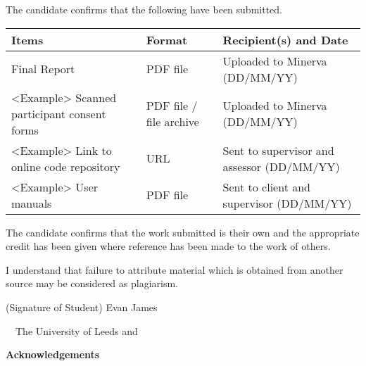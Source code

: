 \frontcover

\clearpage

\noindent The candidate confirms that the following have been submitted.\\


\begin{table}[ht!]
\begin{tabular}{|p{}|p{}|p{}|}
\hline 
Items & Format & Recipient(s) and Date \\ 
\hline 
Final Report & PDF file & Uploaded to Minerva (DD/MM/YY) \\ 
\hline 
<Example> Scanned participant consent forms & PDF file / file archive & Uploaded to Minerva (DD/MM/YY) \\ 
\hline 
<Example> Link to online code repository & URL & Sent to supervisor and assessor (DD/MM/YY) \\ 
\hline 
<Example> User manuals & PDF file & Sent to client and supervisor (DD/MM/YY) \\ 
\hline 
\end{tabular} 
\end{table}


\vfill

\noindent The candidate confirms that the work submitted is their own and the appropriate credit has been given where reference has been made to the work of others.

\vfill

\noindent I understand that failure to attribute material which is obtained from another source may be considered as plagiarism.

\vfill

\flushright(Signature of Student) Evan James
\flushleft

\vfill

\textcopyright~\session~The University of Leeds and~\fullname

\begin{dissertationsummary}

\end{dissertationsummary}

\clearpage
\centering\textbf{Acknowledgements}
\flushleft


\tableofcontents
\clearpage


